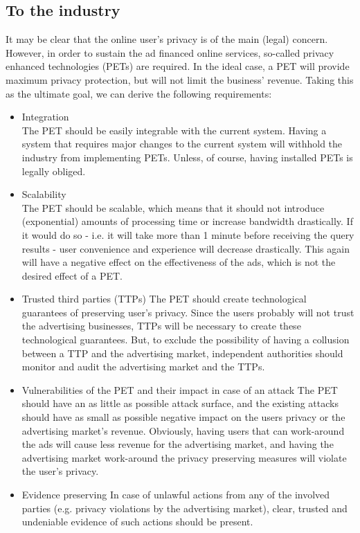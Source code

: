 \documentclass[11pt]{article}
\begin{document}
\subsection{To the industry}
It may be clear that the online user's privacy is of the main (legal) concern. However, in order to sustain the ad financed online services, so-called privacy enhanced technologies (PETs) are required. In the ideal case, a PET will provide maximum privacy protection, but will not limit the business' revenue. Taking this as the ultimate goal, we can derive the following requirements:

\begin{itemize}
	\item Integration\\
		The PET should be easily integrable with the current system. Having a system that requires major changes to the current system will withhold the industry from implementing PETs. Unless, of course, having installed PETs is legally obliged.

	\item Scalability\\
		The PET should be scalable, which means that it should not introduce (exponential) amounts of processing time or increase bandwidth drastically. If it would do so - i.e. it will take more than 1 minute before receiving the query results - user convenience and experience will decrease drastically. This again will have a negative effect on the effectiveness of the ads, which is not the desired effect of a PET.

	\item Trusted third parties (TTPs)
		The PET should create technological guarantees of preserving user's privacy. Since the users probably will not trust the advertising businesses, TTPs will be necessary to create these technological guarantees. But, to exclude the possibility of having a collusion between a TTP and the advertising market, independent authorities should monitor and audit the advertising market and the TTPs.

	\item Vulnerabilities of the PET and their impact in case of an attack
		The PET should have an as little as possible attack surface, and the existing attacks should have as small as possible negative impact on the users privacy or the advertising market's revenue. Obviously, having users that can work-around the ads will cause less revenue for the advertising market, and having the advertising market work-around the privacy preserving measures will violate the user's privacy.

	\item Evidence preserving
		In case of unlawful actions from any of the involved parties (e.g. privacy violations by the advertising market), clear, trusted and undeniable evidence of such actions should be present. 
\end{itemize}
\end{document}
